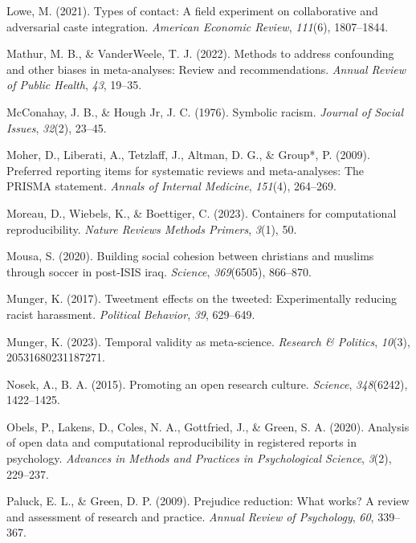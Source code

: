 \documentclass[
  ,jou]{apa6}
\newlength{\cslhangindent}
\newenvironment{CSLReferences}[2] %
 {\begin{list}{}{%
  \setlength{\itemindent}{0pt}
  \setlength{\leftmargin}{0pt}
  \setlength{\parsep}{0pt}
  \ifodd #1
   \setlength{\leftmargin}{\cslhangindent}
   \setlength{\itemindent}{-1\cslhangindent}
  \fi
  \setlength{\itemsep}{#2\baselineskip}}}
 {\end{list}}
\begin{document}
\begin{CSLReferences}{1}{0}
Lowe, M. (2021). Types of contact: A field experiment on collaborative and adversarial caste integration. \emph{American Economic Review}, \emph{111}(6), 1807--1844.

Mathur, M. B., \& VanderWeele, T. J. (2022). Methods to address confounding and other biases in meta-analyses: Review and recommendations. \emph{Annual Review of Public Health}, \emph{43}, 19--35.

McConahay, J. B., \& Hough Jr, J. C. (1976). Symbolic racism. \emph{Journal of Social Issues}, \emph{32}(2), 23--45.

Moher, D., Liberati, A., Tetzlaff, J., Altman, D. G., \& Group*, P. (2009). Preferred reporting items for systematic reviews and meta-analyses: The PRISMA statement. \emph{Annals of Internal Medicine}, \emph{151}(4), 264--269.

Moreau, D., Wiebels, K., \& Boettiger, C. (2023). Containers for computational reproducibility. \emph{Nature Reviews Methods Primers}, \emph{3}(1), 50.

Mousa, S. (2020). Building social cohesion between christians and muslims through soccer in post-ISIS iraq. \emph{Science}, \emph{369}(6505), 866--870.

Munger, K. (2017). Tweetment effects on the tweeted: Experimentally reducing racist harassment. \emph{Political Behavior}, \emph{39}, 629--649.

Munger, K. (2023). Temporal validity as meta-science. \emph{Research \& Politics}, \emph{10}(3), 20531680231187271.

Nosek, A., B. A. (2015). Promoting an open research culture. \emph{Science}, \emph{348}(6242), 1422--1425.

Obels, P., Lakens, D., Coles, N. A., Gottfried, J., \& Green, S. A. (2020). Analysis of open data and computational reproducibility in registered reports in psychology. \emph{Advances in Methods and Practices in Psychological Science}, \emph{3}(2), 229--237.

Paluck, E. L., \& Green, D. P. (2009). Prejudice reduction: What works? A review and assessment of research and practice. \emph{Annual Review of Psychology}, \emph{60}, 339--367.


\end{CSLReferences}
\end{document}
